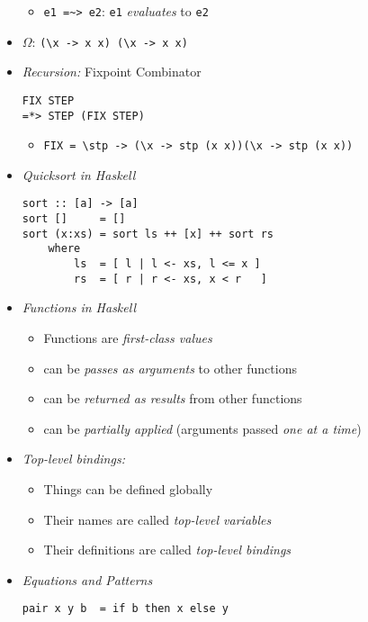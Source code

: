 \documentclass[landscape,8pt]{extarticle}
\newcommand{\code}{\lstinline}
\begin{document}
\begin{multicols}{4}
\begin{itemize}
\begin{itemize}
                  \item \code{e1 =~> e2}: \code{e1} \emph{evaluates} to \code{e2}
              \end{itemize}
        \item $\Omega$: \code{(\x -> x x) (\x -> x x)}
        \item \emph{Recursion:} Fixpoint Combinator
              \begin{lstlisting}
FIX STEP
=*> STEP (FIX STEP)
           \end{lstlisting}
              \begin{itemize}
                  \item \code{FIX = \stp -> (\x -> stp (x x))(\x -> stp (x x))}
              \end{itemize}
        \item \emph{Quicksort in Haskell}
              \begin{lstlisting}
sort :: [a] -> [a]
sort []     = []
sort (x:xs) = sort ls ++ [x] ++ sort rs
    where
        ls  = [ l | l <- xs, l <= x ]
        rs  = [ r | r <- xs, x < r   ]
           \end{lstlisting}
        \item \emph{Functions in Haskell}
              \begin{itemize}
                  \item Functions are \emph{first-class values}
                  \item can be \emph{passes as arguments} to other functions
                  \item can be \emph{returned as results} from other functions
                  \item can be \emph{partially applied} (arguments passed \emph{one at a time})
              \end{itemize}
        \item \emph{Top-level bindings:}
              \begin{itemize}
                  \item Things can be defined globally
                  \item Their names are called \emph{top-level variables}
                  \item Their definitions are called \emph{top-level bindings}
              \end{itemize}
        \item \emph{Equations and Patterns}
              \begin{lstlisting}
pair x y b  = if b then x else y

\end{lstlisting}
\end{itemize}
\end{multicols}
\end{document}
